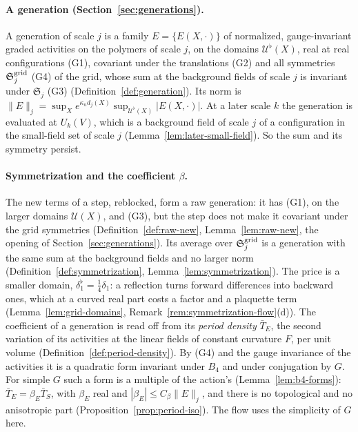 \paragraph{A generation (Section~\ref{sec:generations}).} A generation of scale $j$ is a family $E=\{E(X,\cdot)\}$ of normalized, gauge-invariant graded activities on the polymers of scale $j$, on the domains $\mathcal U^\flat(X)$, real at real configurations (G1), covariant under the translations (G2) and all symmetries $\mathfrak S^{\rm grid}_j$ (G4) of the grid, whose sum at the background fields of scale $j$ is invariant under $\mathfrak S_j$ (G3) (Definition~\ref{def:generation}). Its norm is $\|E\|_j=\sup_Xe^{\kappa_nd_j(X)}\sup_{\mathcal U^\flat(X)}|E(X,\cdot)|$. At a later scale $k$ the generation is evaluated at $U_k(V)$, which is a background field of scale $j$ of a configuration in the small-field set of scale $j$ (Lemma~\ref{lem:later-small-field}). So the sum and its symmetry persist.

\paragraph{Symmetrization and the coefficient $\beta$.} The new terms of a step, reblocked, form a raw generation: it has (G1), on the larger domains $\mathcal U(X)$, and (G3), but the step does not make it covariant under the grid symmetries (Definition~\ref{def:raw-new}, Lemma~\ref{lem:raw-new}, the opening of Section~\ref{sec:generations}). Its average over $\mathfrak S^{\rm grid}_j$ is a generation with the same sum at the background fields and no larger norm (Definition~\ref{def:symmetrization}, Lemma~\ref{lem:symmetrization}). The price is a smaller domain, $\delta_1^\flat=\frac14\delta_1$: a reflection turns forward differences into backward ones, which at a curved real part costs a factor and a plaquette term (Lemma~\ref{lem:grid-domains}, Remark~\ref{rem:symmetrization-flow}(d)). The coefficient of a generation is read off from its \emph{period density} $\bar T_E$, the second variation of its activities at the linear fields of constant curvature $F$, per unit volume (Definition~\ref{def:period-density}). By (G4) and the gauge invariance of the activities it is a quadratic form invariant under $B_4$ and under conjugation by $G$. For simple $G$ such a form is a multiple of the action's (Lemma~\ref{lem:b4-forms}): $\bar T_E=\beta_E\bar T_S$, with $\beta_E$ real and $|\beta_E|\le C_\beta\|E\|_j$, and there is no topological and no anisotropic part (Proposition~\ref{prop:period-iso}). The flow uses the simplicity of $G$ here.

